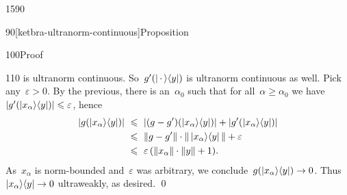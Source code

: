\begin{parsec}{1590}
\begin{point}{90}[ketbra-ultranorm-continuous]{Proposition}
\begin{point}{100}{Proof}
\begin{point}{110}
    is ultranorm continuous.
    So~$g'(\left|\,\cdot\,\right>\!\left<y\right|)$ is ultranorm continuous as well.
Pick any~$\varepsilon > 0$.
By the previous,
    there is an~$\alpha_0$ such that for all~$\alpha \geq \alpha_0$
    we have~$|g'(\left|x_\alpha\right>\!\left<y\right|)| \leqslant \varepsilon$,
    hence
\begin{align*}
        | g(\left|x_\alpha\right>\!\left<y\right|) |
            &\ \leqslant\  | (g-g')(\left|x_\alpha\right>\!\left<y\right|)|  +
                    | g'(\left|x_\alpha\right>\!\left<y\right|) | \\
            &\ \leqslant\  \|g - g'\| \cdot \| \left|x_\alpha\right>\!\left<y\right| \|  + \varepsilon\\
            &\ \leqslant\  \varepsilon \,(\| x_\alpha\| \cdot \|y\| + 1).
\end{align*}
As~$x_\alpha$ is norm-bounded
    and~$\varepsilon$ was arbitrary,
        we conclude~$g(\left|x_\alpha\right>\!\left<y\right|) \to 0$.
    Thus~$\left|x_\alpha\right>\!\left<y\right| \to 0$ ultraweakly, as desired.
    \qed
\end{point}
\end{point}
\end{point}
\end{parsec}

